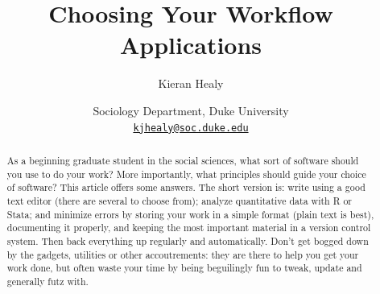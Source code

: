 \documentclass[11pt,article,oneside]{memoir}
\begin{document}
\pagestyle{kjh}

\setsansfont[Mapping=tex-text]{Myriad Pro} 
\setmonofont[Mapping=tex-text,Scale=0.9]{Inconsolata} 

\title{\bigskip Choosing Your Workflow Applications}

\author{Kieran Healy}
\date{Sociology Department, Duke University \\ {\scriptsize{\texttt{\href{mailto:kjhealy@soc.duke.edu}{kjhealy@soc.duke.edu}}}}} 



\maketitle

%  


\thispagestyle{kjhgit}
 
\begin{abstract}
\noindent As a beginning graduate student in the social sciences, what sort of software should you use to do your work? More importantly, what principles should guide your choice of software? This article offers some answers. The short version is: write using a good text editor (there are several to choose from); analyze quantitative data with R or Stata; and minimize errors by storing your work in a simple format (plain text is best), documenting it properly, and keeping the most important material in a version control system. Then back everything up regularly and automatically. Don't get bogged down by the gadgets, utilities or other accoutrements: they are there to help you get your work done, but often  waste your time by being beguilingly fun to tweak, update and generally futz with.  
\end{abstract}
\end{document}
